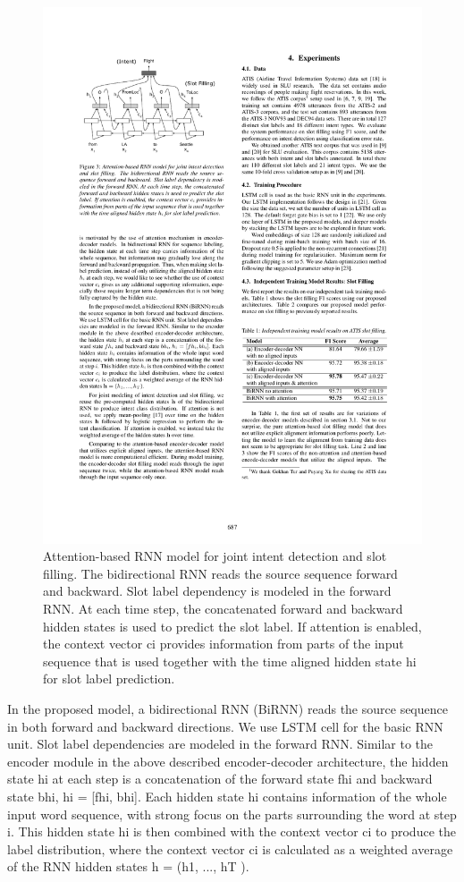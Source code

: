 \begin{figure}
	\centering
	\includegraphics[width=\textwidth]{fig/att-mod}
	\caption[Attention Based RNN Model]{Attention-based RNN model for joint intent detection
		and slot filling. The bidirectional RNN reads the source sequence
		forward and backward. Slot label dependency is modeled
		in the forward RNN. At each time step, the concatenated
		forward and backward hidden states is used to predict the slot
		label. If attention is enabled, the context vector ci provides information
		from parts of the input sequence that is used together
		with the time aligned hidden state hi for slot label prediction.}
\end{figure}
In the proposed model, a bidirectional RNN (BiRNN) reads
the source sequence in both forward and backward directions.
We use LSTM cell for the basic RNN unit. Slot label dependencies
are modeled in the forward RNN. Similar to the encoder
module in the above described encoder-decoder architecture,
the hidden state hi at each step is a concatenation of the forward
state fhi and backward state bhi, hi = [fhi, bhi]. Each
hidden state hi contains information of the whole input word
sequence, with strong focus on the parts surrounding the word
at step i. This hidden state hi is then combined with the context
vector ci to produce the label distribution, where the context
vector ci is calculated as a weighted average of the RNN hidden
states h = (h1, ..., hT ).

